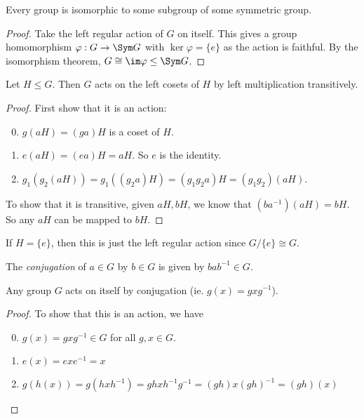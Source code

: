 \documentclass[a4paper]{article}
\begin{document}
\begin{thm}
  Every group is isomorphic to some subgroup of some symmetric group.
\end{thm}

\begin{proof}
  Take the left regular action of $G$ on itself. This gives a group homomorphism $\varphi: G\to \Sym G$ with $\ker \varphi = \{e\}$ as the action is faithful. By the isomorphism theorem, $G \cong \im \varphi \leq \Sym G$.
\end{proof}

\begin{lemma}
  Let $H\leq G$. Then $G$ acts on the left cosets of $H$ by left multiplication transitively.
\end{lemma}

\begin{proof}
  First show that it is an action:
  \begin{enumerate}[label=\arabic{*}.]
      \setcounter{enumi}{-1}
    \item $g(aH) = (ga)H$ is a coset of $H$.
    \item $e(aH) = (ea)H = aH$. So $e$ is the identity.
    \item $g_1(g_2(aH)) = g_1((g_2a)H) = (g_1g_2a)H = (g_1g_2)(aH)$.
  \end{enumerate}

  To show that it is transitive, given $aH, bH$, we know that $(ba^{-1})(aH) = bH$. So any $aH$ can be mapped to $bH$.
\end{proof}
\note If $H = \{e\}$, then this is just the left regular action since $G/\{e\} \cong G$.

\begin{defi}
  The \emph{conjugation} of $a\in G$ by $b\in G$ is given by $bab^{-1}\in G$.
\end{defi}

\begin{lemma}
  Any group $G$ acts on itself by conjugation (ie. $g(x) = gxg^{-1}$).
\end{lemma}

\begin{proof}
  To show that this is an action, we have
  \begin{enumerate}[label=\arabic{*}.]
      \setcounter{enumi}{-1}
    \item $g(x) = gxg^{-1} \in G$ for all $g, x\in G$.
    \item $e(x) = exe^{-1} = x$
    \item $g(h(x)) = g(hxh^{-1}) = ghxh^{-1}g^{-1} = (gh)x(gh)^{-1} = (gh)(x)$
  \end{enumerate}
\end{proof}
\end{document}
